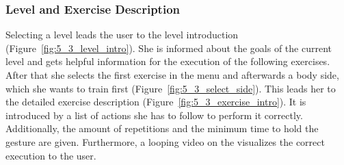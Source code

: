 \subsubsection{Level and Exercise Description}
Selecting a level leads the user to the level introduction (Figure~\ref{fig:5_3_level_intro}). She is informed about the goals of the current level and gets helpful information for the execution of the following exercises. After that she selects the first exercise in the menu and afterwards a body side, which she wants to train first (Figure~\ref{fig:5_3_select_side}). This leads her to the detailed exercise description (Figure~\ref{fig:5_3_exercise_intro}). It is introduced by a list of actions she has to follow to perform it correctly. Additionally, the amount of repetitions and the minimum time to hold the gesture are given. Furthermore, a looping video on the visualizes the correct execution to the user.
